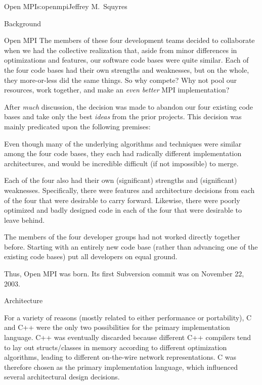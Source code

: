 \begin{aosachapter}{Open MPI}{s:openmpi}{Jeffrey M.\ Squyres}
\begin{aosasect1}{Background}
\begin{aosasect2}{Open MPI}
The members of these four development teams decided to collaborate
when we had the collective realization that, aside from minor
differences in optimizations and features, our software code bases
were quite similar.  Each of the four code bases had their own
strengths and weaknesses, but on the whole, they more-or-less did the
same things.  So why compete?  Why not pool our resources, work
together, and make an \emph{even better} MPI implementation?

After \emph{much} discussion, the decision was made to abandon our four
existing code bases and take only the best \emph{ideas} from the prior
projects.  This decision was mainly predicated upon the following
premises:

\begin{aosaitemize}
\item Even though many of the underlying algorithms and techniques
  were similar among the four code bases, they each had radically
  different implementation architectures, and would be incredible
  difficult (if not impossible) to merge.
\item Each of the four also had their own (significant) strengths and
  (significant) weaknesses.  Specifically, there were features and
  architecture decisions from each of the four that were desirable to
  carry forward.  Likewise, there were poorly optimized and badly
  designed code in each of the four that were desirable to leave
  behind.
\item The members of the four developer groups had not worked directly
  together before.  Starting with an entirely new code base (rather
  than advancing one of the existing code bases) put all developers on
  equal ground.
\end{aosaitemize}

Thus, Open MPI was born.  Its first Subversion commit was on November
22, 2003.

\end{aosasect2}

\end{aosasect1}


\begin{aosasect1}{Architecture}

For a variety of reasons (mostly related to either performance or
portability), C and C++ were the only two possibilities for the
primary implementation language.  
%
C++ was eventually discarded because different C++ compilers tend to
lay out structs/classes in memory according to different optimization
algorithms, leading to different on-the-wire network representations.
%
C was therefore chosen as the primary implementation language, which
influenced several architectural design decisions.


\end{aosasect1}
\end{aosachapter}
